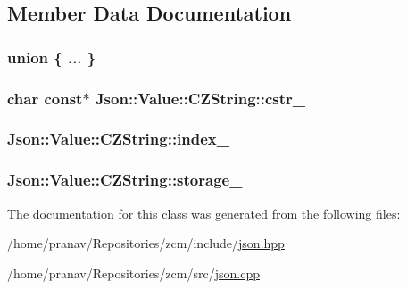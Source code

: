 \subsection{Member Data Documentation}
\subsubsection[{\texorpdfstring{"@2}{@2}}]{\setlength{\rightskip}{0pt plus 5cm}union \{ ... \} \hspace{0.3cm}{\ttfamily [private]}}\hypertarget{classJson_1_1Value_1_1CZString_a3309a845ee55902fd9845189182811d9}{}\label{classJson_1_1Value_1_1CZString_a3309a845ee55902fd9845189182811d9}
\subsubsection[{\texorpdfstring{cstr\+\_\+}{cstr_}}]{\setlength{\rightskip}{0pt plus 5cm}char const$\ast$ Json\+::\+Value\+::\+C\+Z\+String\+::cstr\+\_\+\hspace{0.3cm}{\ttfamily [private]}}\hypertarget{classJson_1_1Value_1_1CZString_a5b4d28349294034d7f779c3c95d0306c}{}\label{classJson_1_1Value_1_1CZString_a5b4d28349294034d7f779c3c95d0306c}
\subsubsection[{\texorpdfstring{index\+\_\+}{index_}}]{ Json\+::\+Value\+::\+C\+Z\+String\+::index\+\_\+}\hypertarget{classJson_1_1Value_1_1CZString_aecf29982235c9c165a0971023ebbb270}{}\label{classJson_1_1Value_1_1CZString_aecf29982235c9c165a0971023ebbb270}
\subsubsection[{\texorpdfstring{storage\+\_\+}{storage_}}]{ Json\+::\+Value\+::\+C\+Z\+String\+::storage\+\_\+}\hypertarget{classJson_1_1Value_1_1CZString_a17c92f0f089a4314e3b1d5695dc1a851}{}\label{classJson_1_1Value_1_1CZString_a17c92f0f089a4314e3b1d5695dc1a851}


The documentation for this class was generated from the following files\+:\begin{DoxyCompactItemize}
\item 
/home/pranav/\+Repositories/zcm/include/\hyperlink{json_8hpp}{json.\+hpp}\item 
/home/pranav/\+Repositories/zcm/src/\hyperlink{json_8cpp}{json.\+cpp}\end{DoxyCompactItemize}
